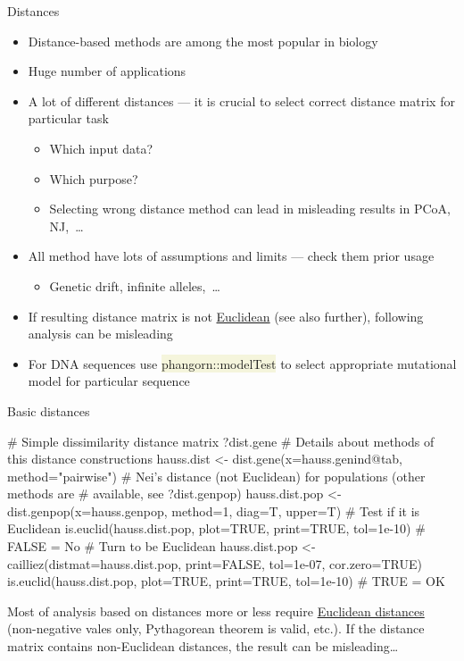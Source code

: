 \documentclass[compress, xelatex, 11pt, xcolor=svgnames, aspectratio=169, url={hyphens, lowtilde}]{beamer}
\renewcommand{\texttt}[1]{\colorbox{Beige}{{\ttfamily #1}}}
\begin{document}
\begin{frame}[fragile]{Distances}
	\label{distances}
	\begin{itemize}
		\item Distance-based methods are among the most popular in biology
		\item Huge number of applications
		\item A lot of different distances --- it is crucial to select correct distance matrix for particular task
		\begin{itemize}
			\item Which input data?
			\item Which purpose?
			\item Selecting wrong distance method can lead in misleading results in PCoA, NJ,~\ldots
		\end{itemize}
		\item All method have lots of assumptions and limits --- check them prior usage
		\begin{itemize}
			\item Genetic drift, infinite alleles,~\ldots
		\end{itemize}
		\item If resulting distance matrix is not \href{https://en.wikipedia.org/wiki/Euclidean_distance_matrix}{Euclidean} (see also further), following analysis can be misleading
		\item For DNA sequences use \texttt{phangorn::modelTest} to select appropriate mutational model for particular sequence
	\end{itemize}
\end{frame}

\begin{frame}[fragile]{Basic distances}
	\begin{spluscode}
    # Simple dissimilarity distance matrix
    ?dist.gene # Details about methods of this distance constructions
    hauss.dist <- dist.gene(x=hauss.genind@tab, method="pairwise")
    # Nei's distance (not Euclidean) for populations (other methods are
    # available, see ?dist.genpop)
    hauss.dist.pop <- dist.genpop(x=hauss.genpop, method=1, diag=T, upper=T)
    # Test if it is Euclidean
    is.euclid(hauss.dist.pop, plot=TRUE, print=TRUE, tol=1e-10) # FALSE = No
    # Turn to be Euclidean
    hauss.dist.pop <- cailliez(distmat=hauss.dist.pop, print=FALSE, tol=1e-07,
      cor.zero=TRUE)
    is.euclid(hauss.dist.pop, plot=TRUE, print=TRUE, tol=1e-10) # TRUE = OK
	\end{spluscode}
	\vfil
	Most of analysis based on distances more or less require \href{https://en.wikipedia.org/wiki/Euclidean_distance_matrix}{Euclidean distances} (non-negative vales only, Pythagorean theorem is valid, etc.). If the distance matrix contains non-Euclidean distances, the result can be misleading\ldots
	\vfill
\end{frame}
\end{document}

